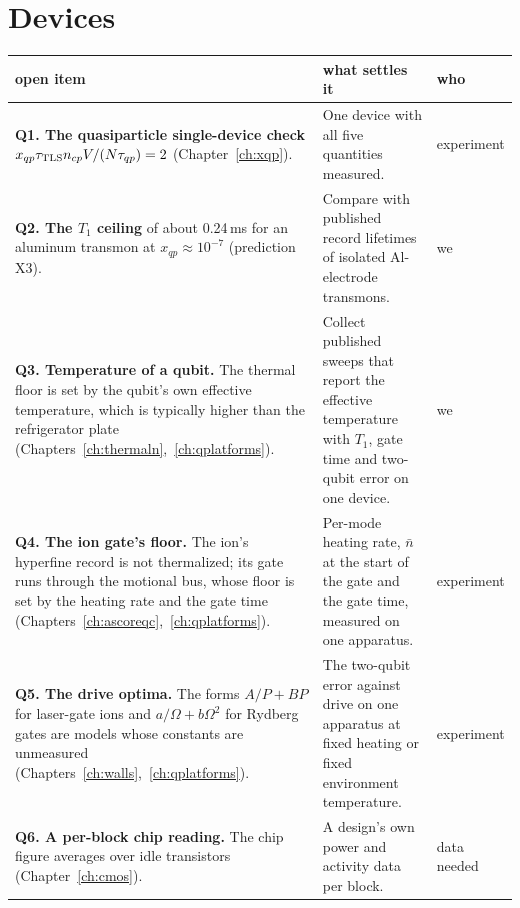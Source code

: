\section{Devices}
{\small\begin{longtable}{@{}>{\raggedright\arraybackslash}p{}>{\raggedright\arraybackslash}p{}>{\raggedright\arraybackslash}p{}@{}}
\toprule
open item & what settles it & who \\\midrule\endhead
\textbf{Q1. The quasiparticle single-device check} $x_{qp}\tau_{\rm TLS}n_{cp}V/(N\tau_{qp})=2$ (Chapter~\ref{ch:xqp}). & One device with all five quantities
 measured. & experiment \\
\textbf{Q2. The $T_1$ ceiling} of about 0.24\,ms for an aluminum transmon at $x_{qp}\approx10^{-7}$ (prediction X3). & Compare with published
 record lifetimes of isolated Al-electrode transmons. & we \\
\textbf{Q3. Temperature of a qubit.} The thermal floor is set by the qubit's own effective temperature, which is typically higher than the
 refrigerator plate (Chapters~\ref{ch:thermaln},~\ref{ch:qplatforms}). & Collect published sweeps that report the effective temperature with $T_1$,
 gate time and two-qubit error on one device. & we \\
\textbf{Q4. The ion gate's floor.} The ion's hyperfine record is not thermalized; its gate runs through the motional bus, whose floor is set by
 the heating rate and the gate time (Chapters~\ref{ch:ascoreqc},~\ref{ch:qplatforms}). & Per-mode heating rate, $\bar n$ at the start of the gate
 and the gate time, measured on one apparatus. & experiment \\
\textbf{Q5. The drive optima.} The forms $A/P+BP$ for laser-gate ions and $a/\Omega+b\Omega^2$ for Rydberg gates are models whose
 constants are unmeasured (Chapters~\ref{ch:walls},~\ref{ch:qplatforms}). & The two-qubit error against drive on one apparatus at fixed heating
 or fixed environment temperature. & experiment \\
\textbf{Q6. A per-block chip reading.} The chip figure averages over idle transistors (Chapter~\ref{ch:cmos}). & A design's own power and
 activity data per block. & data needed \\
\bottomrule
\end{longtable}}

